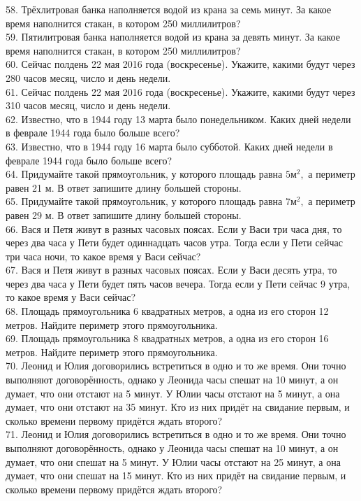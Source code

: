 58. Трёхлитровая банка наполняется водой из крана за семь минут. За какое время наполнится стакан, в котором 250 миллилитров?\\
59. Пятилитровая банка наполняется водой из крана за девять минут. За какое время наполнится стакан, в котором 250 миллилитров?\\
60. Сейчас полдень 22 мая 2016 года (воскресенье). Укажите, какими будут через 280 часов месяц, число и день недели.\\
61. Сейчас полдень 22 мая 2016 года (воскресенье). Укажите, какими будут через 310 часов месяц, число и день недели.\\
62. Известно, что в 1944 году 13 марта было понедельником. Каких дней недели в феврале 1944 года было больше всего?\\
63. Известно, что в 1944 году 16 марта было субботой. Каких дней недели в феврале 1944 года было больше всего?\\
64. Придумайте такой прямоугольник, у которого площадь равна $5\text{м}^2,$ а периметр равен 21 м. В ответ запишите длину большей стороны.\\
65. Придумайте такой прямоугольник, у которого площадь равна $7\text{м}^2,$ а периметр равен 29 м. В ответ запишите длину большей стороны.\\
66. Вася и Петя живут в разных часовых поясах. Если у Васи три часа дня, то через два часа у Пети будет одиннадцать часов утра. Тогда если у Пети сейчас три часа ночи, то какое время у Васи сейчас?\\
67. Вася и Петя живут в разных часовых поясах. Если у Васи десять утра, то через два часа у Пети будет пять часов вечера. Тогда если у Пети сейчас 9 утра, то какое время у Васи сейчас?\\
68. Площадь прямоугольника 6 квадратных метров, а одна из его сторон 12 метров. Найдите периметр этого прямоугольника.\\
69. Площадь прямоугольника 8 квадратных метров, а одна из его сторон 16 метров. Найдите периметр этого прямоугольника.\\
70. Леонид и Юлия договорились встретиться в одно и то же время. Они точно выполняют договорённость, однако у Леонида часы спешат на 10 минут, а он думает, что они отстают на 5 минут. У Юлии часы отстают на 5 минут, а она думает, что они отстают на 35 минут. Кто из них придёт на свидание первым, и сколько времени первому придётся ждать второго?\\
71. Леонид и Юлия договорились встретиться в одно и то же время. Они точно выполняют договорённость, однако у Леонида часы спешат на 10 минут, а он думает, что они спешат на 5 минут. У Юлии часы отстают на 25 минут, а она думает, что они спешат на 15 минут. Кто из них придёт на свидание первым, и сколько времени первому придётся ждать второго?\\
